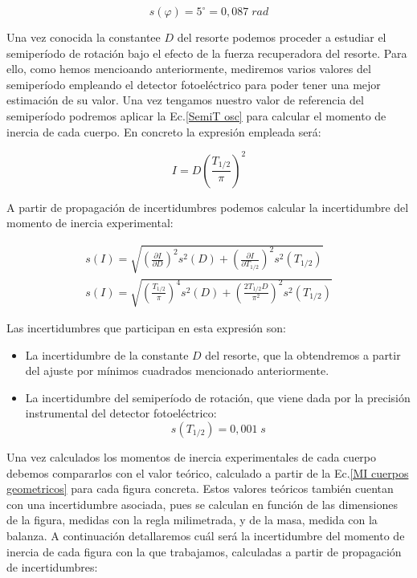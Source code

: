 \documentclass[a4paper,12pt,titlepage]{report}
\begin{document}
\begin{equation}
    s(\varphi) = 5^\circ = 0,087 \;rad
\end{equation}

Una vez conocida la constantee $D$ del resorte podemos proceder a estudiar el semiperíodo de rotación bajo el efecto de la fuerza recuperadora del resorte. Para ello, como hemos mencioando anteriormente, mediremos varios valores del semiperíodo empleando el detector fotoeléctrico para poder tener una mejor estimación de su valor. Una vez tengamos nuestro valor de referencia del semiperíodo podremos aplicar la Ec.\ref{SemiT osc} para calcular el momento de inercia de cada cuerpo. En concreto la expresión empleada será:

\begin{equation}
    I = D \left (\frac{T_{1/2}}{\pi}\right )^2
    \label{Calculo MI figuras}
\end{equation}

A partir de propagación de incertidumbres podemos calcular la incertidumbre del momento de inercia experimental:

\begin{equation}
    \begin{gathered}
        s(I) = \sqrt{\left (\frac{\partial I}{\partial D}\right )^2s^2(D) + \left (\frac{\partial I}{\partial T_{1/2}}\right )^2s^2(T_{1/2})}\\
        s(I) = \sqrt{\left (\frac{T_{1/2}}{\pi}\right )^4s^2(D) + \left (\frac{2T_{1/2}D}{\pi^2}\right )^2s^2(T_{1/2})}
        \label{Inc MI figuras}
    \end{gathered}
\end{equation}

Las incertidumbres que participan en esta expresión son:

\begin{itemize}
    \item La incertidumbre de la constante $D$ del resorte, que la obtendremos a partir del ajuste por mínimos cuadrados mencionado anteriormente.
    \item La incertidumbre del semiperíodo de rotación, que viene dada por la precisión instrumental del detector fotoeléctrico:
    \begin{equation}
        s(T_{1/2}) = 0,001 \;s
    \end{equation}
\end{itemize}

\newpage

Una vez calculados los momentos de inercia experimentales de cada cuerpo debemos compararlos con el valor teórico, calculado a partir de la Ec.\ref{MI cuerpos geometricos} para cada figura concreta. Estos valores teóricos también cuentan con una incertidumbre asociada, pues se calculan en función de las dimensiones de la figura, medidas con la regla milimetrada, y de la masa, medida con la balanza. A continuación detallaremos cuál será la incertidumbre del momento de inercia de cada figura con la que trabajamos, calculadas a partir de propagación de incertidumbres:
\end{document}
